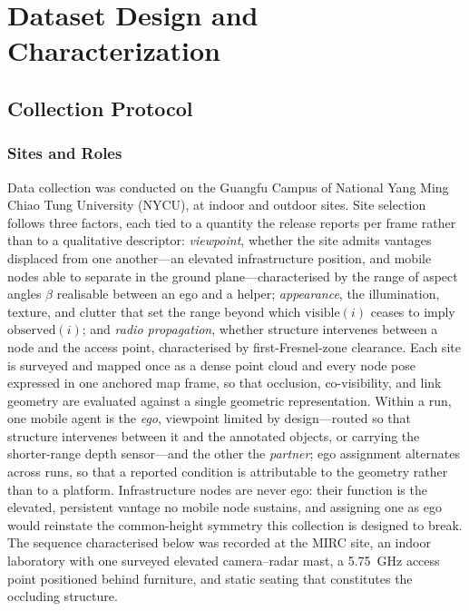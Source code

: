 \section{Dataset Design and Characterization}
\label{sec:collection}

\subsection{Collection Protocol}

\subsubsection{Sites and Roles}
\label{sec:environments}

Data collection was conducted on the Guangfu Campus of National Yang Ming Chiao
Tung University (NYCU), at indoor and outdoor sites. Site selection follows
three factors, each tied to a quantity the release reports per frame rather than
to a qualitative descriptor: \emph{viewpoint}, whether the site admits vantages
displaced from one another---an elevated infrastructure position, and mobile
nodes able to separate in the ground plane---characterised by the range of
aspect angles $\beta$ realisable between an ego and a helper;
\emph{appearance}, the illumination, texture, and clutter that set the range
beyond which $\mathrm{visible}(i)$ ceases to imply $\mathrm{observed}(i)$; and
\emph{radio propagation}, whether structure intervenes between a node and the
access point, characterised by first-Fresnel-zone clearance. Each site is
surveyed and mapped once as a dense point cloud and every node pose expressed in
one anchored map frame, so that occlusion, co-visibility, and link geometry are
evaluated against a single geometric representation. Within a run, one mobile
agent is the \emph{ego}, viewpoint limited by design---routed so that structure
intervenes between it and the annotated objects, or carrying the shorter-range
depth sensor---and the other the \emph{partner}; ego assignment alternates
across runs, so that a reported condition is attributable to the geometry rather
than to a platform. Infrastructure nodes are never ego: their function is the
elevated, persistent vantage no mobile node sustains, and assigning one as ego
would reinstate the common-height symmetry this collection is designed to break.
The sequence characterised below was recorded at the MIRC site, an indoor
laboratory with one surveyed elevated camera--radar mast, a
\SI{5.75}{\giga\hertz} access point positioned behind furniture, and static
seating that constitutes the occluding structure.

